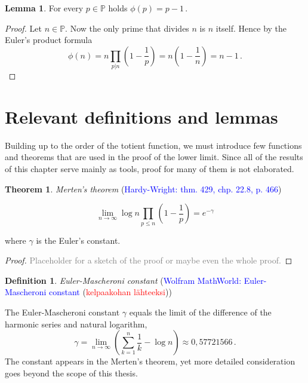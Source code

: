 \documentclass{article}
\theoremstyle{definition}
\newtheorem{definition}[subsection]{Definition}
\newtheorem{lemma}[subsection]{Lemma}
\newtheorem{theorem}[subsection]{Theorem}
\begin{document}
\begin{lemma}
\label{thm:phiprime}
For every $p \in \mathbb{P}$ holds $\phi(p) = p-1$\,.

\begin{proof}

Let $n\in\mathbb{P}$. Now the only prime that divides $n$ is $n$ itself. Hence by the Euler's product formula
\begin{equation*}
    \phi(n) = n \prod_{p \vert n} \left(1 - \frac{1}{p}\right) = n\left(1-\frac{1}{n}\right) = n-1\,.
\end{equation*}

\end{proof}

\end{lemma}

\section{Relevant definitions and lemmas}

Building up to the order of the totient function, we must introduce few functions and theorems that are used in the proof of the lower limit. Since all of the results of this chapter serve mainly as tools, proof for many of them is not elaborated.

\begin{theorem}{\emph{Merten's theorem} (\textcolor{blue}{Hardy-Wright: thm. 429, chp. 22.8, p. 466})}
\label{thm:mertens}

\begin{equation*}
    \lim_{n \rightarrow \infty} \log n \prod_{p\leq n} \left(1-\frac{1}{p}\right) = e^{-\gamma}
\end{equation*}

where $\gamma$ is the Euler's constant.

\begin{proof}

\textcolor{gray}{Placeholder for a sketch of the proof or maybe even the whole proof.}

\end{proof}

\end{theorem}

\begin{definition}{\emph{Euler-Mascheroni constant} (\textcolor{blue}{Wolfram MathWorld: Euler-Mascheroni constant} (\textcolor{red}{kelpaakohan lähteeksi}))}

The Euler-Mascheroni constant $\gamma$ equals the limit of the difference of the harmonic series and natural logarithm,
\begin{equation*}
    \gamma=\lim_{n\rightarrow\infty} \left(\sum_{k=1}^n \frac{1}{k} - \log n\right) \approx 0,57721566\,.
\end{equation*}
The constant appears in the Merten's theorem, yet more detailed consideration goes beyond the scope of this thesis.

\end{definition}
\end{document}
